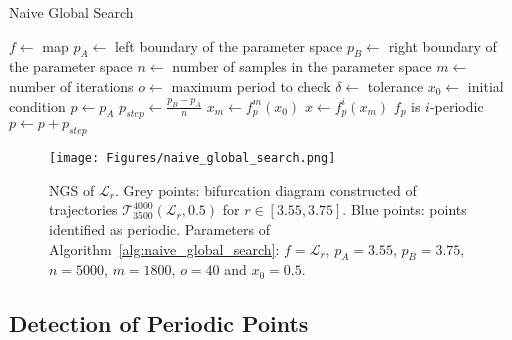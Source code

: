 \begin{algorithm}[!h]
    \caption{Naive Global Search}
    \label{alg:naive_global_search}
    \begin{algorithmic}[1]
        \Statex $f \gets$ map
        \Statex $p_{A} \gets$ left boundary of the parameter space
        \Statex $p_{B} \gets$ right boundary of the parameter space
        \Statex $n \gets$ number of samples in the parameter space
        \Statex $m \gets$ number of iterations
        \Statex $o \gets$ maximum period to check
        \Statex $\delta \gets$ tolerance
        \Statex $x_0 \gets$ initial condition
        \State $p \gets p_{A}$
        \State $p_{step} \gets \frac{p_{B} - p_{A}}{n}$
            \State $x_m \gets f_{p}^{m}(x_0)$
                \State $x \gets f_{p}^{i}(x_m)$
                    \State $f_p$ is $i$-periodic
                \EndIf
            \EndFor
            \State $p \gets p + p_{step}$
        \EndWhile
    \end{algorithmic}
\end{algorithm}

\begin{figure}[!h]
    \centering
    \texttt{[image: Figures/naive\_global\_search.png]}
    \caption{
        NGS of $\mathcal{L}_{r}$.
        Grey points: bifurcation diagram constructed of trajectories $\mathcal{T}_{3500}^{4000}(\mathcal{L}_{r}, 0.5)$ for $r \in [3.55, 3.75]$.
        Blue points: points identified as periodic. 
        Parameters of Algorithm~\ref{alg:naive_global_search}: $f = \mathcal{L}_{r}$, $p_{A} = 3.55$, $p_{B} = 3.75$, $n=5000$, $m=1800$, $o=40$ and $x_0 = 0.5$.
    }
    \label{fig:naive_global_search}
\end{figure}

\subsection{Detection of Periodic Points}
\label{subsec: detection_of_periodic_points}

